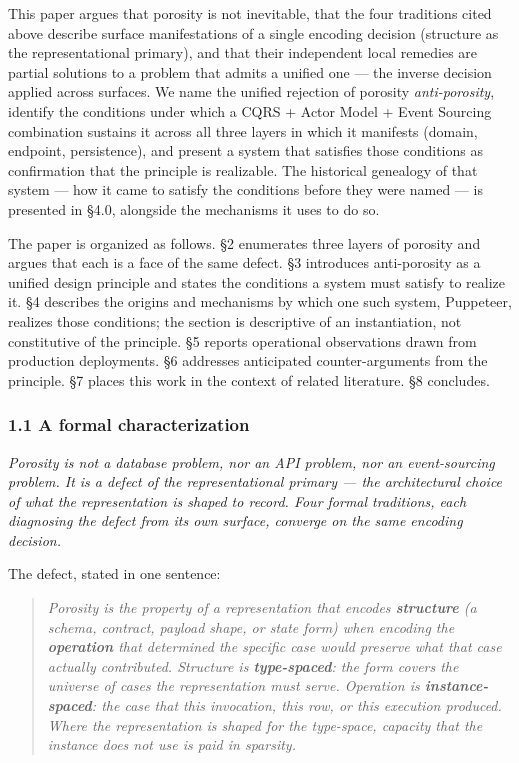 \documentclass[
]{article}
\begin{document}
This paper argues that porosity is not inevitable, that the four
traditions cited above describe surface manifestations of a single
encoding decision (structure as the representational primary), and that
their independent local remedies are partial solutions to a problem that
admits a unified one --- the inverse decision applied across surfaces.
We name the unified rejection of porosity \emph{anti-porosity}, identify
the conditions under which a CQRS + Actor Model + Event Sourcing
combination sustains it across all three layers in which it manifests
(domain, endpoint, persistence), and present a system that satisfies
those conditions as confirmation that the principle is realizable. The
historical genealogy of that system --- how it came to satisfy the
conditions before they were named --- is presented in §4.0, alongside
the mechanisms it uses to do so.

The paper is organized as follows. §2 enumerates three layers of
porosity and argues that each is a face of the same defect. §3
introduces anti-porosity as a unified design principle and states the
conditions a system must satisfy to realize it. §4 describes the origins
and mechanisms by which one such system, Puppeteer, realizes those
conditions; the section is descriptive of an instantiation, not
constitutive of the principle. §5 reports operational observations drawn
from production deployments. §6 addresses anticipated counter-arguments
from the principle. §7 places this work in the context of related
literature. §8 concludes.

\subsubsection{1.1 A formal
characterization}\label{a-formal-characterization}

\emph{Porosity is not a database problem, nor an API problem, nor an
event-sourcing problem. It is a defect of the representational primary
--- the architectural choice of what the representation is shaped to
record. Four formal traditions, each diagnosing the defect from its own
surface, converge on the same encoding decision.}

The defect, stated in one sentence:

\begin{quote}
\emph{Porosity is the property of a representation that encodes
\textbf{structure} (a schema, contract, payload shape, or state form)
when encoding the \textbf{operation} that determined the specific case
would preserve what that case actually contributed. Structure is
\textbf{type-spaced}: the form covers the universe of cases the
representation must serve. Operation is \textbf{instance-spaced}: the
case that this invocation, this row, or this execution produced. Where
the representation is shaped for the type-space, capacity that the
instance does not use is paid in sparsity.}
\end{quote}
\end{document}
